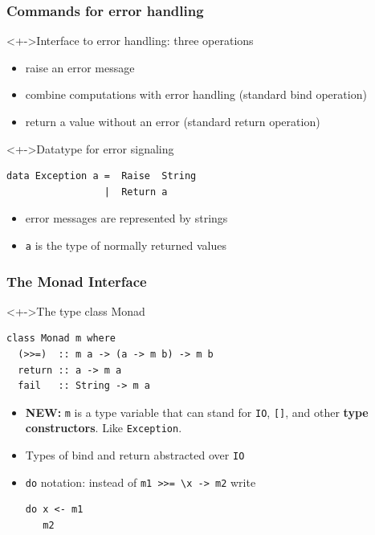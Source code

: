 \documentclass{beamer}
\begin{document}
\begin{frame}[fragile]
  \frametitle{Commands for error handling}
  \begin{block}<+->{Interface to error handling: three operations}
    \begin{itemize}
    \item raise an error message
    \item combine computations with error handling (standard bind
      operation)
    \item return a value without an error (standard return operation)
    \end{itemize}
  \end{block}
  \begin{block}<+->{Datatype for error signaling}
\begin{lstlisting}
data Exception a =  Raise  String
                 |  Return a
\end{lstlisting}
    \begin{itemize}
    \item error messages are represented by strings
    \item \lstinline{a} is the type of normally returned values
    \end{itemize}
  \end{block}
\end{frame}
\begin{frame}[fragile]
  \frametitle{The Monad Interface}
\begin{block}<+->{The type class Monad}
\begin{lstlisting}
class Monad m where
  (>>=)  :: m a -> (a -> m b) -> m b
  return :: a -> m a
  fail   :: String -> m a
\end{lstlisting}
  \begin{itemize}
  \item \alert{\textbf{NEW:}} \texttt{m} is a type variable that can
    stand for \texttt{IO}, \texttt{[]}, and other \textbf{type
      constructors}. Like \lstinline{Exception}.
  \item Types of bind and return abstracted over \lstinline{IO}
  \item \lstinline{do} notation: instead of
    \lstinline{m1 >>= \x -> m2} write
\begin{lstlisting}
do x <- m1
   m2
\end{lstlisting}
  \end{itemize}
\end{block}
\end{frame}     
\end{document}
